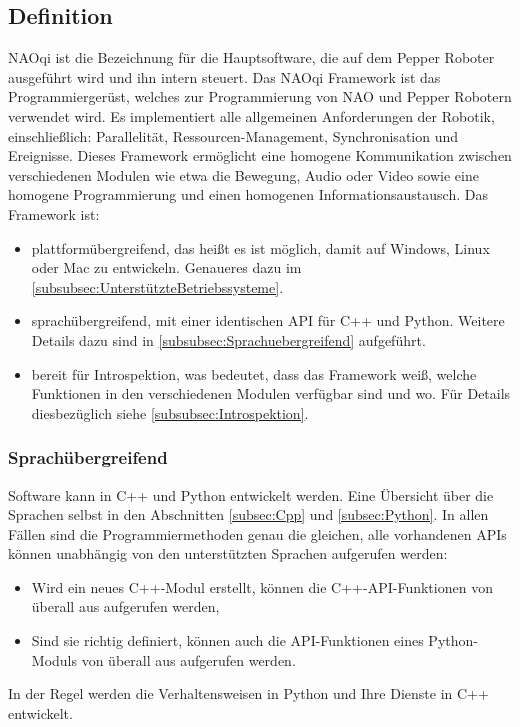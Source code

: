 \subsection{Definition}
\label{subsec:Definition}
NAOqi ist die Bezeichnung für die Hauptsoftware, die auf dem Pepper Roboter ausgeführt wird und ihn intern steuert. Das NAOqi Framework ist das Programmiergerüst, welches zur Programmierung von NAO und Pepper Robotern verwendet wird. Es implementiert alle allgemeinen Anforderungen der Robotik, einschließlich: Parallelität, Ressourcen-Management, Synchronisation und Ereignisse. Dieses Framework ermöglicht eine homogene Kommunikation zwischen verschiedenen Modulen wie etwa die Bewegung, Audio oder Video sowie eine homogene Programmierung und einen homogenen Informationsaustausch. Das Framework ist:
\begin{itemize}
    \item plattformübergreifend, das heißt es ist möglich, damit auf Windows, Linux oder Mac zu entwickeln. Genaueres dazu im \autoref{subsubsec:UnterstützteBetriebssysteme}.
    \item sprachübergreifend, mit einer identischen API für C++ und Python. Weitere Details dazu sind in \autoref{subsubsec:Sprachuebergreifend} aufgeführt.
    \item bereit für Introspektion, was bedeutet, dass das Framework weiß, welche Funktionen in den verschiedenen Modulen verfügbar sind und wo. Für Details diesbezüglich siehe \autoref{subsubsec:Introspektion}.
\end{itemize}

\subsubsection{Sprachübergreifend}
\label{subsubsec:Sprachuebergreifend}
Software kann in C++ und Python entwickelt werden. Eine Übersicht über die Sprachen selbst in den Abschnitten \autoref{subsec:Cpp} und \autoref{subsec:Python}. In allen Fällen sind die Programmiermethoden genau die gleichen, alle vorhandenen \acp{API} können unabhängig von den unterstützten Sprachen aufgerufen werden:
\begin{itemize}
    \item Wird ein neues C++-Modul erstellt, können die C++-\ac{API}-Funktionen von überall aus aufgerufen werden,
    \item Sind sie richtig definiert, können auch die \ac{API}-Funktionen eines Python-Moduls von überall aus aufgerufen werden.
\end{itemize}
In der Regel werden die Verhaltensweisen in Python und Ihre Dienste in C++ entwickelt.

